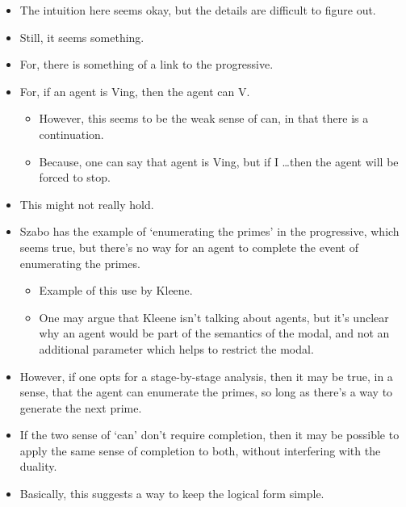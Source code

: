 \documentclass[10pt]{article}
\begin{document}
\begin{itemize}
\item The intuition here seems okay, but the details are difficult to figure out.
\item Still, it seems something.
\item For, there is something of a link to the progressive.
\item For, if an agent is Ving, then the agent can V.
  \begin{itemize}
  \item However, this seems to be the weak sense of can, in that there is a continuation.
  \item Because, one can say that agent is Ving, but if I \dots then the agent will be forced to stop.
  \end{itemize}
\item This might not really hold.
\item Szabo has the example of `enumerating the primes' in the progressive, which seems true, but there's no way for an agent to complete the event of enumerating the primes.
  \begin{itemize}
  \item Example of this use by Kleene.
  \item One may argue that Kleene isn't talking about agents, but it's unclear why an agent would be part of the semantics of the modal, and not an additional parameter which helps to restrict the modal.
  \end{itemize}
\item However, if one opts for a stage-by-stage analysis, then it may be true, in a sense, that the agent can enumerate the primes, so long as there's a way to generate the next prime.
\end{itemize}

\begin{itemize}
\item If the two sense of `can' don't require completion, then it may be possible to apply the same sense of completion to both, without interfering with the duality.
\item Basically, this suggests a way to keep the logical form simple.
\end{itemize}
\end{document}
